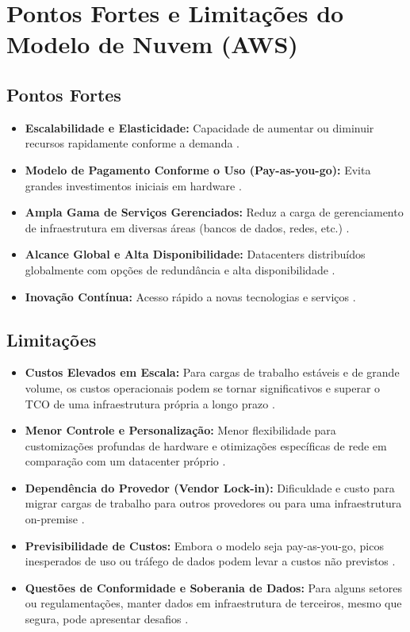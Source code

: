 \documentclass[
	12pt,				%
	oneside,			%
	a4paper,			%
	english,			%
	brazil				%
	]{abntex2unama}
\begin{document}
\section{Pontos Fortes e Limitações do Modelo de Nuvem (AWS)}
\subsection{Pontos Fortes}
\begin{itemize}
	\item \textbf{Escalabilidade e Elasticidade:} Capacidade de aumentar ou diminuir recursos rapidamente conforme a demanda \cite{cloud_infrastructure}.
	\item \textbf{Modelo de Pagamento Conforme o Uso (Pay-as-you-go):} Evita grandes investimentos iniciais em hardware \cite{datacenter_automation}.
	\item \textbf{Ampla Gama de Serviços Gerenciados:} Reduz a carga de gerenciamento de infraestrutura em diversas áreas (bancos de dados, redes, etc.) \cite{ai_automation}.
	\item \textbf{Alcance Global e Alta Disponibilidade:} Datacenters distribuídos globalmente com opções de redundância e alta disponibilidade \cite{disaster_recovery}.
	\item \textbf{Inovação Contínua:} Acesso rápido a novas tecnologias e serviços \cite{software_defined}.
\end{itemize}

\subsection{Limitações}
\begin{itemize}
	\item \textbf{Custos Elevados em Escala:} Para cargas de trabalho estáveis e de grande volume, os custos operacionais podem se tornar significativos e superar o TCO de uma infraestrutura própria a longo prazo \cite{dcim_systems}.
	\item \textbf{Menor Controle e Personalização:} Menor flexibilidade para customizações profundas de hardware e otimizações específicas de rede em comparação com um datacenter próprio \cite{design_principles}.
	\item \textbf{Dependência do Provedor (Vendor Lock-in):} Dificuldade e custo para migrar cargas de trabalho para outros provedores ou para uma infraestrutura on-premise \cite{containerization}.
	\item \textbf{Previsibilidade de Custos:} Embora o modelo seja pay-as-you-go, picos inesperados de uso ou tráfego de dados podem levar a custos não previstos \cite{power_distribution}.
	\item \textbf{Questões de Conformidade e Soberania de Dados:} Para alguns setores ou regulamentações, manter dados em infraestrutura de terceiros, mesmo que segura, pode apresentar desafios \cite{datacenter_security}.
\end{itemize}
\end{document}
